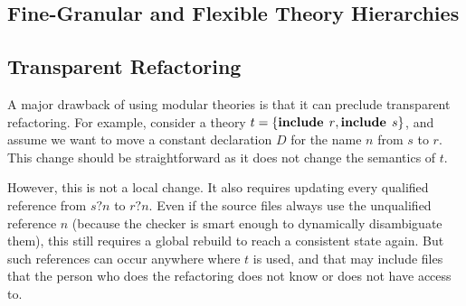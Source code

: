 \subsection{Fine-Granular and Flexible Theory Hierarchies}


\subsection{Transparent Refactoring}

A major drawback of using modular theories is that it can preclude transparent refactoring.
For example, consider a theory $t=\{\operatorname{\mathbf{include}}{\;r},\operatorname{\mathbf{include}}{\;s}\}$, and assume we want to move a constant declaration $D$ for the name $n$ from $s$ to $r$.
This change should be straightforward as it does not change the semantics of $t$.

However, this is not a local change.
It also requires updating every qualified reference from $s?n$ to $r?n$.
Even if the source files always use the unqualified reference $n$ (because the checker is smart enough to dynamically disambiguate them), this still requires a global rebuild to reach a consistent state again.
But such references can occur anywhere where $t$ is used, and that may include files that the person who does the refactoring does not know or does not have access to.

